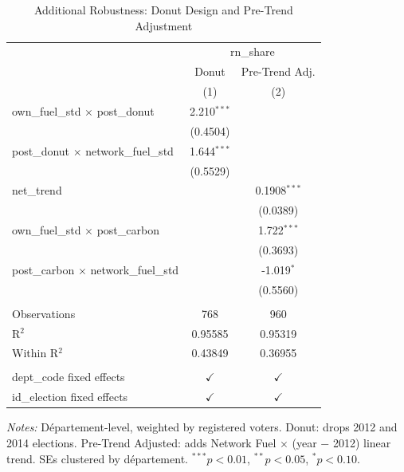 \begin{table}[htbp]
   \caption{\label{tab:additional_robustness} Additional Robustness: Donut Design and Pre-Trend Adjustment}
   \bigskip
   \centering
   \begin{tabular}{lcc}
      \toprule
       & \multicolumn{2}{c}{rn\_share}\\
                                                   & Donut         & Pre-Trend Adj. \\   
                                                   & (1)           & (2)\\  
      \midrule 
      own\_fuel\_std $\times$ post\_donut          & 2.210$^{***}$ &   \\   
                                                   & (0.4504)      &   \\   
      post\_donut $\times$ network\_fuel\_std      & 1.644$^{***}$ &   \\   
                                                   & (0.5529)      &   \\   
      net\_trend                                   &               & 0.1908$^{***}$\\   
                                                   &               & (0.0389)\\   
      own\_fuel\_std $\times$ post\_carbon         &               & 1.722$^{***}$\\   
                                                   &               & (0.3693)\\   
      post\_carbon $\times$ network\_fuel\_std     &               & -1.019$^{*}$\\   
                                                   &               & (0.5560)\\   
       \\
      Observations                                 & 768           & 960\\  
      R$^2$                                        & 0.95585       & 0.95319\\  
      Within R$^2$                                 & 0.43849       & 0.36955\\  
       \\
      dept\_code fixed effects                     & $\checkmark$  & $\checkmark$\\   
      id\_election fixed effects                   & $\checkmark$  & $\checkmark$\\   
      \bottomrule
   \end{tabular}
   
   \par \raggedright 
   \textit{Notes:} D\'{e}partement-level, weighted by registered voters. Donut: drops 2012 and 2014 elections. Pre-Trend Adjusted: adds Network Fuel $\times$ (year $-$ 2012) linear trend. SEs clustered by d\'{e}partement. $^{***}p<0.01$, $^{**}p<0.05$, $^{*}p<0.10$.
\end{table}
